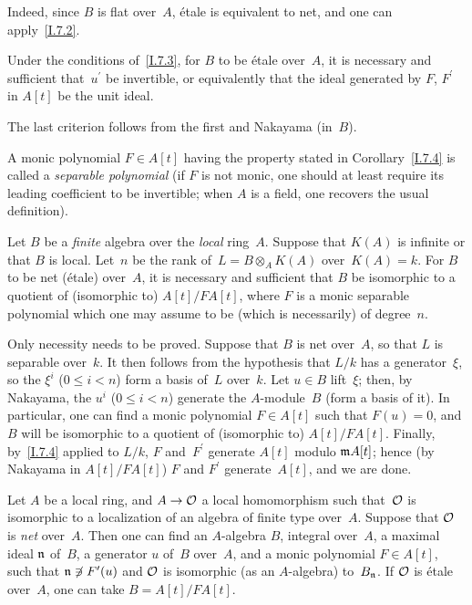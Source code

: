 Indeed, since $B$ is flat over~$A$, \'etale is equivalent to
net, and one can apply~\ref{I.7.2}.

\begin{corollary}
\label{I.7.4}
Under the conditions of~\ref{I.7.3}, for $B$ to be \'etale
over~$A$, it is necessary and sufficient that~$u^\prime$ be
invertible, or equivalently that the ideal generated by $F$,
$F^\prime$ in $A[t]$ be the unit ideal.
\end{corollary}

The last criterion follows from the first and Nakayama (in~$B$).

A monic polynomial $F\in A[t]$ having the property stated in
Corollary~\ref{I.7.4}
is called a \emph{separable polynomial} (if $F$ is not monic,
one should at least require its leading coefficient to be
invertible; when $A$ is a field, one recovers the usual definition).

\begin{corollary}
\label{I.7.5}
Let $B$ be a \emph{finite} algebra over the \emph{local} ring~$A$.
Suppose that $K(A)$ is infinite or that $B$ is local. Let~$n$
be the rank of~$L=B\otimes_A K(A)$ over~$K(A)=k$. For $B$ to
be net (\resp \'etale) over~$A$, it is necessary and sufficient
that $B$ be isomorphic to a quotient of (\resp isomorphic to)
$A[t]/FA[t]$, where $F$ is a monic separable polynomial which
one may assume to be (\resp which is necessarily) of degree~$n$.
\end{corollary}

Only necessity needs to be proved. Suppose that $B$ is net
over~$A$, so that $L$ is separable over~$k$. It then follows
from the hypothesis that $L/k$ has a generator~$\xi$, so the
$\xi^i$ ($0\leq i<n$) form a basis of~$L$ over~$k$. Let
$u\in B$ lift~$\xi$; then, by Nakayama, the $u^i$ ($0\leq i<n$)
generate the $A$-module~$B$ (\resp form a basis of it).
In particular, one can find a monic polynomial $F\in A[t]$
such that $F(u)=0$, and $B$ will be isomorphic to a quotient
of (\resp isomorphic to) $A[t]/FA[t]$. Finally, by~\ref{I.7.4}
applied to $L/k$, $F$ and~$F^\prime$ generate $A[t]$ modulo
$\goth{m}A[t]$; hence (by Nakayama in $A[t]/FA[t]$) $F$ and
$F^\prime$ generate~$A[t]$, and we are done.

\begin{theorem}
\label{I.7.6}
Let $A$ be a local ring, and $A\to\cal{O}$ a local homomorphism
such that~$\cal{O}$ is isomorphic to a localization of an algebra
of finite type over~$A$. Suppose that $\cal{O}$ is \emph{net}
over~$A$. Then one can find an $A$-algebra $B$, integral over~$A$,
a maximal ideal $\goth{n}$ of~$B$, a generator $u$ of~$B$
over~$A$, and a monic polynomial $F\in A[t]$, such that
$\goth{n}\not\ni F^\prime(u)$ and $\cal{O}$ is isomorphic
(as an $A$-algebra) to~$B_{\goth{n}}$. If $\cal{O}$ is \'etale
over~$A$, one can take $B=A[t]/FA[t]$.
\end{theorem}

